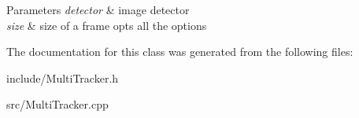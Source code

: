 \begin{DoxyParams}{Parameters}
{\em detector} & image detector \\
\hline
{\em size} & size of a frame  opts all the options \\
\hline
\end{DoxyParams}


The documentation for this class was generated from the following files\+:\begin{DoxyCompactItemize}
\item 
include/Multi\+Tracker.\+h\item 
src/Multi\+Tracker.\+cpp\end{DoxyCompactItemize}
